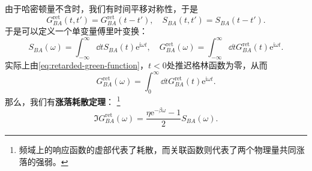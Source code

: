 \documentclass[hyperref, UTF8, a4paper]{ctexart}
\newcommand*{\ii}{\mathrm{i}}
\newcommand*{\ee}{\mathrm{e}}
\begin{document}
由于哈密顿量不含时，我们有时间平移对称性，于是
\begin{equation}
    G_{BA}^\text{ret}(t,t') = G_{BA}^\text{ret}(t-t'), \quad S_{BA}(t,t') = S_{BA}(t-t').
\end{equation}
于是可以定义一个单变量傅里叶变换：
\begin{equation}
    S_{BA}(\omega) = \int_{-\infty}^\infty \dd{t} S_{BA}(t) \ee^{\ii \omega t}, \quad G_{BA}^\text{ret}(\omega) = \int_{-\infty}^\infty \dd{t} G_{BA}^\text{ret}(t) \ee^{\ii \omega t}.
\end{equation}
实际上由\eqref{eq:retarded-green-function}，$t<0$处推迟格林函数为零，从而
\[
    G_{BA}^\text{ret}(\omega) = \int_0^\infty \dd{t} G_{BA}^\text{ret}(t) \ee^{\ii \omega t}.
\]
那么，我们有\textbf{涨落耗散定理}：%
\footnote{频域上的响应函数的虚部代表了耗散，而关联函数则代表了两个物理量共同涨落的强弱。}
\begin{equation}
    \Im G_{BA}^\text{ret}(\omega) = \frac{\eta \ee^{-\beta \omega} - 1}{2} S_{BA}(\omega).
\end{equation}
\end{document}
